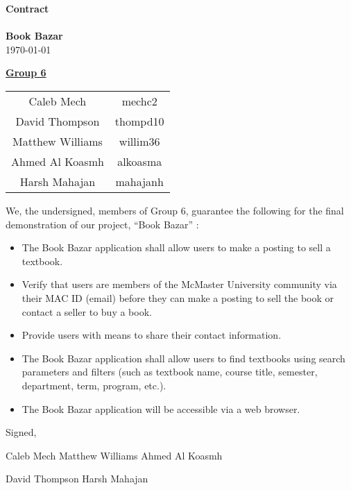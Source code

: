 \documentclass[fullpage]{article}
\newcommand{\bi}{\begin{itemize}}
\newcommand{\ei}{\end{itemize}}
\begin{document}
\vspace*{\fill}
\begin{center}

  {\Huge \textbf{Contract}}\\
\hrulefill\\[2mm]
  {\huge \textbf{Book Bazar}}\\[2mm]
{\large \today}\\[15mm]
{\large
\underline{\textbf{Group 6}}\\
\begin{tabular}{ c c }

 Caleb Mech & mechc2\\ 
 David Thompson & thompd10\\
 Matthew Williams & willim36\\
 Ahmed Al Koasmh & alkoasma\\
 Harsh Mahajan	& mahajanh    
\end{tabular}
}

\end{center}

\vspace*{\fill}

\newpage
We, the undersigned, members of Group 6, guarantee the following for the final demonstration of our project, ``Book Bazar'' :
\bi
\item The Book Bazar application shall allow users to make a posting to sell a textbook.
\item Verify that users are members of the McMaster University community via their MAC ID (email) before they can make a posting to sell the book or contact a seller to buy a book.
\item Provide users with means to share their contact information.
\item The Book Bazar application shall allow users to find textbooks using search parameters and filters (such as textbook name, course title, semester, department, term, program, etc.).
\item The Book Bazar application will be accessible via a web browser.\\
\ei


Signed,\\


\vspace{1.5cm}

Caleb Mech \hspace{3.5cm} Matthew Williams \hspace{3.5cm} Ahmed Al Koasmh\\

 \vspace{1.75cm} 

David Thompson \hspace{2.8cm} Harsh Mahajan
\end{document}
